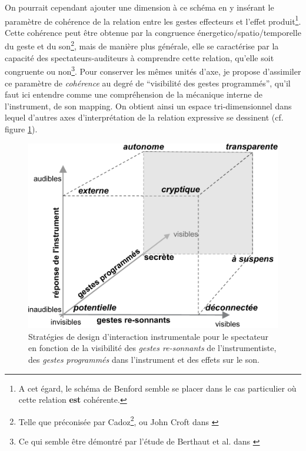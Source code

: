 \indent On pourrait cependant ajouter une dimension à ce schéma en y insérant le paramètre de cohérence de la relation entre les gestes effecteurs et l'effet produit\footnote{A cet égard, le schéma de Benford semble se placer dans le cas particulier où cette relation \textbf{est} cohérente.}. Cette cohérence peut être obtenue par la congruence énergetico/spatio/temporelle du geste et du son\footnote{Telle que préconisée par Cadoz\footnote{Cf. supra p. \pageref{sec:gesture:ergotic}.}, ou John Croft dans \cite{croft_theses_2007}}, mais de manière plus générale, elle se caractérise par la capacité des spectateurs-auditeurs à comprendre cette relation, qu'elle soit congruente ou non\footnote{Ce qui semble être démontré par l'étude de Berthaut et al. dans \cite{berthaut_rouages:_2013}}. Pour conserver les mêmes unités d'axe, je propose d'assimiler ce paramètre de \textit{cohérence} au degré de ``visibilité des gestes programmés'', qu'il faut ici entendre comme une compréhension de la mécanique interne de l'instrument, de son mapping. On obtient ainsi un espace tri-dimensionnel dans lequel d'autres axes d'interprétation de la relation expressive se dessinent (cf. figure \ref{fig:gesture:expressive-space}).\\
\begin{figure}[H]
	\captionsetup{format=plain}%
	\centering
	\begin{minipage}[t]{0.8\textwidth}
		\includegraphics[width=\linewidth]{gfx/03_gesture/SubversiveCube.pdf}
		\caption[Stratégies de design d'interaction instrumentale pour le spectateur]{Stratégies de design d'interaction instrumentale pour le spectateur en fonction de la visibilité des \textit{gestes re-sonnants} de l'instrumentiste, des \textit{gestes programmés} dans l'instrument et des effets sur le son.}
		\label{fig:gesture:expressive-space}
	\end{minipage}
\end{figure}
